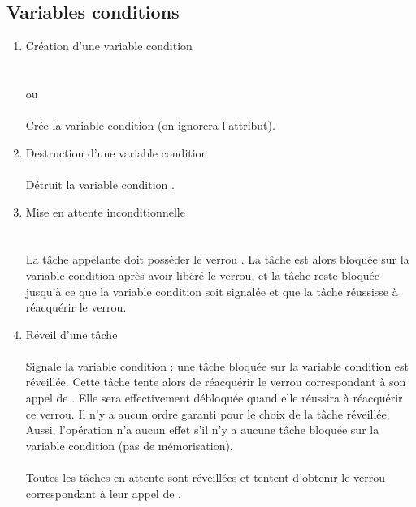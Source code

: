 \subsection*{Variables conditions}
\begin{enumerate}
\item Création d'une variable condition \\
\hspace*{1cm} \\
\hspace*{5cm} \\
ou \\
\hspace*{1cm} \\
Crée la variable condition  (on ignorera l'attribut).
\item Destruction d'une variable condition \\
\hspace*{1cm} \\
Détruit la variable condition .
\item Mise en attente inconditionnelle \\
\hspace*{1cm}\\
\hspace*{5cm} \\
La tâche appelante doit posséder le verrou . La tâche est alors bloquée sur la variable condition  après avoir libéré le verrou, et la tâche reste bloquée jusqu'à ce que la variable condition soit signalée et que la tâche réussisse à réacquérir le verrou.
\item Réveil d'une tâche \\
\hspace*{1cm} \\
Signale la variable condition : une tâche bloquée sur la variable condition  est réveillée. Cette tâche tente alors de réacquérir le verrou correspondant à son appel de . Elle sera effectivement débloquée quand elle réussira à réacquérir ce verrou. Il n'y a aucun ordre garanti pour le choix de la tâche réveillée. Aussi, l'opération  n'a aucun effet s'il n'y a aucune tâche bloquée sur la variable condition (pas de mémorisation). \\
\hspace*{1cm} \\
Toutes les tâches en attente sont réveillées et tentent d'obtenir le verrou correspondant à leur appel de .
\end{enumerate}


